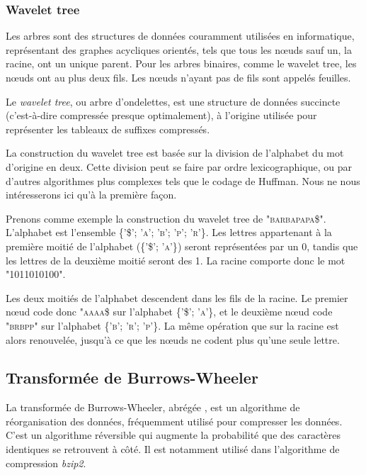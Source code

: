\subsubsection{Wavelet tree}
Les arbres sont des structures de données couramment utilisées en informatique, représentant des graphes acycliques orientés, tels que tous les nœuds sauf un, la racine, ont un unique parent. Pour les arbres binaires, comme le wavelet tree, les nœuds ont au plus deux fils. Les nœuds n'ayant pas de fils sont appelés feuilles.

Le \textit{wavelet tree}, ou arbre d'ondelettes, est une structure de données succincte (c'est-à-dire compressée presque optimalement), à l'origine utilisée pour représenter les tableaux de suffixes compressés.

La construction du wavelet tree est basée sur la division de l'alphabet du mot d'origine en deux. Cette division peut se faire par ordre lexicographique, ou par d'autres algorithmes plus complexes tels que le codage de Huffman. Nous ne nous intéresserons ici qu'à la première façon.

Prenons comme exemple la construction du wavelet tree de \textsc{"barbapapa\$"}. L'alphabet est l'ensemble \textsc{\{'\$'; 'a'; 'b'; 'p'; 'r'\}}. Les lettres appartenant à la première moitié de l'alphabet (\textsc{\{'\$'; 'a'\}}) seront représentées par un 0, tandis que les lettres de la deuxième moitié seront des 1. La racine comporte donc le mot "1011010100".

Les deux moitiés de l'alphabet descendent dans les fils de la racine. Le premier nœud code donc \textsc{"aaaa\$} sur l'alphabet \textsc{\{'\$'; 'a'\}}, et le deuxième nœud code \textsc{"brbpp"} sur l'alphabet \textsc{\{'b'; 'r'; 'p'\}}. La même opération que sur la racine est alors renouvelée, jusqu'à ce que les nœuds ne codent plus qu'une seule lettre.


\subsection{Transformée de Burrows-Wheeler}

La transformée de Burrows-Wheeler, abrégée \bwt, est un algorithme de réorganisation des données, fréquemment utilisé pour compresser les données. C'est un algorithme réversible qui augmente la probabilité que des caractères identiques se retrouvent à côté. Il est notamment utilisé dans l'algorithme de compression \emph{bzip2}.

